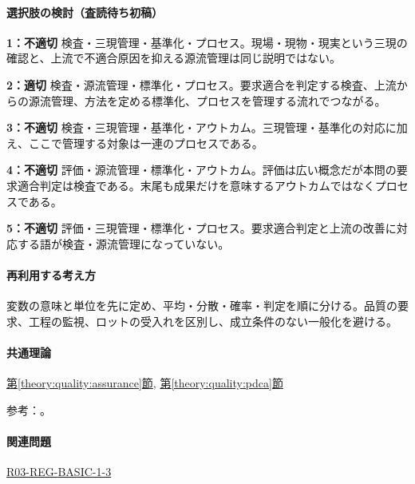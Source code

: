 \paragraph{選択肢の検討（査読待ち初稿）}\mbox{}\par

\noindent\textbf{1：不適切} 検査・三現管理・基準化・プロセス。現場・現物・現実という三現の確認と、上流で不適合原因を抑える源流管理は同じ説明ではない。\par

\noindent\textbf{2：適切} 検査・源流管理・標準化・プロセス。要求適合を判定する検査、上流からの源流管理、方法を定める標準化、プロセスを管理する流れでつながる。\par

\noindent\textbf{3：不適切} 検査・三現管理・基準化・アウトカム。三現管理・基準化の対応に加え、ここで管理する対象は一連のプロセスである。\par

\noindent\textbf{4：不適切} 評価・源流管理・標準化・アウトカム。評価は広い概念だが本問の要求適合判定は検査である。末尾も成果だけを意味するアウトカムではなくプロセスである。\par

\noindent\textbf{5：不適切} 評価・三現管理・標準化・プロセス。要求適合判定と上流の改善に対応する語が検査・源流管理になっていない。\par

\paragraph{再利用する考え方} 変数の意味と単位を先に定め、平均・分散・確率・判定を順に分ける。品質の要求、工程の監視、ロットの受入れを区別し、成立条件のない一般化を避ける。

\paragraph{共通理論} \hyperref[theory:quality:assurance]{第\ref*{theory:quality:assurance}節}, \hyperref[theory:quality:pdca]{第\ref*{theory:quality:pdca}節}

\par 参考：\cite{quality_process_jsqc,quality_iso_process}。

\paragraph{関連問題} \hyperref[q:r03-reg-basic-1-3]{R03-REG-BASIC-1-3}

